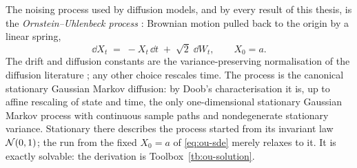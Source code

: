 The noising process used by diffusion models, and by every result of this
thesis, is the \emph{Ornstein--Uhlenbeck process}
\citep{uhlenbeck1930theory}: Brownian motion pulled back to the origin by a
linear spring,
\begin{equation}
  \dd X_t \;=\; -X_t\,\dd t \;+\; \sqrt{2}\;\dd W_t ,
  \qquad X_0 = a .
  \label{eq:ou-sde}
\end{equation}
The drift and diffusion constants are the variance-preserving normalisation of
the diffusion literature \citep{song2021scorebased}; any other choice rescales
time. The process is the canonical stationary Gaussian Markov diffusion: by Doob's
characterisation \citep{doob1942brownian} it is, up to affine rescaling of
state and time, the only one-dimensional stationary Gaussian Markov process
with continuous sample paths and nondegenerate stationary variance. Stationary
there describes the process started from its invariant law $\mathcal{N}(0,1)$; the run
from the fixed $X_0 = a$ of \eqref{eq:ou-sde} merely relaxes to it. It is exactly solvable: the
derivation is Toolbox~\ref{tb:ou-solution}.

